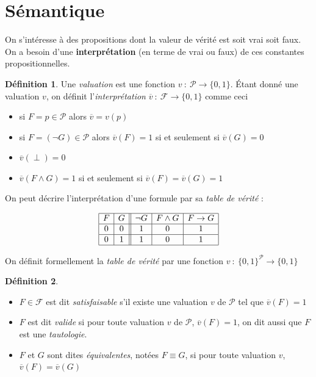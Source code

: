 \documentclass[]{article}
\theoremstyle{remark}
\theoremstyle{definition}
\newtheorem{mydef}{Définition}
\newcommand{\fun}[3]{
#1 ~ : ~ #2 \longrightarrow #3
}
\begin{document}
\section{Sémantique}

On s'intéresse à des propositions dont la valeur de vérité est soit vrai soit faux. On a besoin d'une \textbf{interprétation} (en terme de vrai ou faux) de ces constantes propositionnelles.

\begin{mydef}
	Une \textit{valuation} est une fonction $v ~ : ~ \mathcal{P} \longrightarrow \{0, 1\}$.
	Étant donné une valuation $v$, on définit l'\textit{interprétation} $\fun{\overline{v}}{\mathcal{F}}{\{0, 1\}}$ comme ceci
	\begin{itemize}
		\item si $F = p \in \mathcal{P}$ alors $\overline{v}=v(p)$
		\item si $F = (\neg G) \in \mathcal{P}$ alors $\overline{v}(F) = 1$ si et seulement si $\overline{v}(G) = 0$
		\item $\overline{v}(\perp)=0$
		\item $\overline{v}(F \land G) = 1$ si et seulement si $\overline{v} (F) = \overline{v} (G) = 1$
	\end{itemize}
\end{mydef}

On peut décrire l'interprétation d'une formule par sa \textit{table de vérité} :

$$
	\begin{array}{|c|c||c|c|c|}
		\hline
		F & G & \neg G & F \land G & F \rightarrow G \\
		\hline
		0 & 0 & 1 & 0 & 1 \\
		\hline
		0 & 1 & 1 & 0 & 1 \\
		\hline
	\end{array}
$$

On définit formellement la \textit{table de vérité} par une fonction $\fun{v}{\{0, 1\}^\mathcal{P}}{\{0, 1\}}$

\begin{mydef}
	\leavevmode
	\begin{itemize}
		\item $F \in \mathcal{F}$ est dit \textit{satisfaisable} s'il existe une valuation $v$ de $\mathcal{P}$ tel que $\overline{v}(F)=1$
		\item $F$ est dit \textit{valide} si pour toute valuation $v$ de $\mathcal{P}$, $\overline{v}(F) = 1$, on dit aussi que $F$ est une \textit{tautologie}.
		\item $F$ et $G$ sont dites \textit{équivalentes}, notées $F \equiv G$, si pour toute valuation $v$, $\overline{v}(F)=\overline{v}(G)$
	\end{itemize}
\end{mydef}
\end{document}
